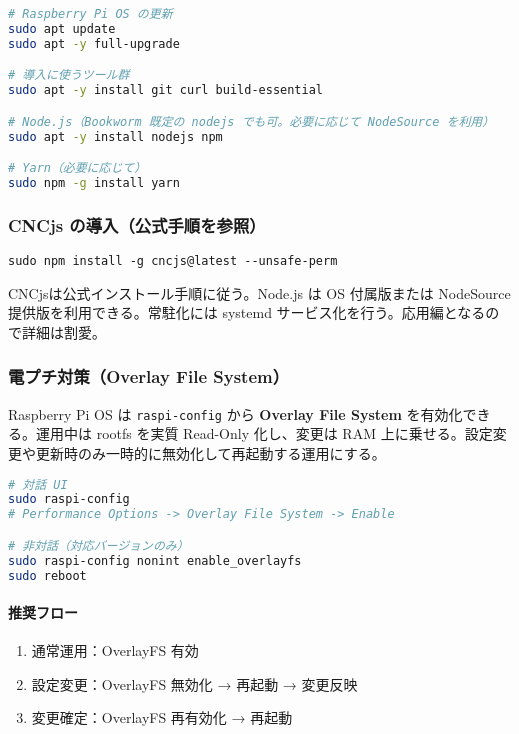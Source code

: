 \documentclass[uplatex,dvipdfmx]{ujarticle}
\begin{document}
\begin{lstlisting}[caption=初期パッケージ導入（APT）, label=code:apt-init, language=bash]
# Raspberry Pi OS の更新
sudo apt update
sudo apt -y full-upgrade

# 導入に使うツール群
sudo apt -y install git curl build-essential

# Node.js（Bookworm 既定の nodejs でも可。必要に応じて NodeSource を利用）
sudo apt -y install nodejs npm

# Yarn（必要に応じて）
sudo npm -g install yarn
\end{lstlisting}

\subsubsection*{CNCjs の導入（公式手順を参照）}

\begin{lstlisting}
sudo npm install -g cncjs@latest --unsafe-perm
\end{lstlisting}
CNCjsは公式インストール手順に従う\cite{cncjs-install,cncjs-rpi,cncjs-npm}。Node.js は OS 付属版または NodeSource 提供版を利用できる\cite{nodejs-pkg,nodesource}。常駐化には systemd サービス化を行う\cite{systemd-service}。応用編となるので詳細は割愛｡


\subsubsection*{電プチ対策（Overlay File System）}

Raspberry Pi OS は \texttt{raspi-config} から \textbf{Overlay File System} \cite{rpi-config, rpi-overlay-wp}を有効化できる。運用中は rootfs を実質 Read-Only 化し、変更は RAM 上に乗せる。設定変更や更新時のみ一時的に無効化して再起動する運用にする。

\begin{lstlisting}[caption=OverlayFS の有効化, label=code:overlay, language=bash]
# 対話 UI
sudo raspi-config
# Performance Options -> Overlay File System -> Enable

# 非対話（対応バージョンのみ）
sudo raspi-config nonint enable_overlayfs
sudo reboot
\end{lstlisting}

\paragraph{推奨フロー}
\begin{enumerate}
  \item 通常運用：OverlayFS 有効
  \item 設定変更：OverlayFS 無効化 → 再起動 → 変更反映
  \item 変更確定：OverlayFS 再有効化 → 再起動
\end{enumerate}
\end{document}
